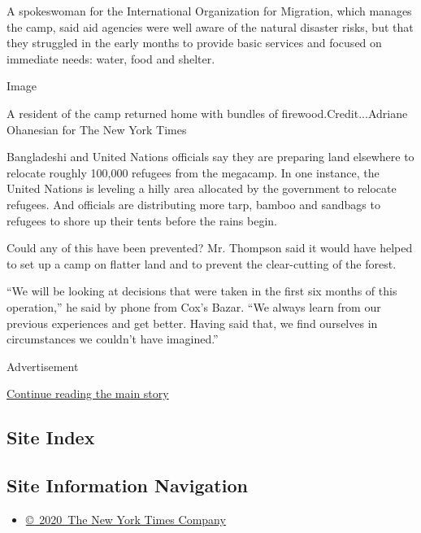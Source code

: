 A spokeswoman for the International Organization for Migration, which
manages the camp, said aid agencies were well aware of the natural
disaster risks, but that they struggled in the early months to provide
basic services and focused on immediate needs: water, food and shelter.

Image

A resident of the camp returned home with bundles of
firewood.Credit...Adriane Ohanesian for The New York Times

Bangladeshi and United Nations officials say they are preparing land
elsewhere to relocate roughly 100,000 refugees from the megacamp. In one
instance, the United Nations is leveling a hilly area allocated by the
government to relocate refugees. And officials are distributing more
tarp, bamboo and sandbags to refugees to shore up their tents before the
rains begin.

Could any of this have been prevented? Mr. Thompson said it would have
helped to set up a camp on flatter land and to prevent the clear-cutting
of the forest.

``We will be looking at decisions that were taken in the first six
months of this operation,'' he said by phone from Cox's Bazar. ``We
always learn from our previous experiences and get better. Having said
that, we find ourselves in circumstances we couldn't have imagined.''

Advertisement

\protect\hyperlink{after-bottom}{Continue reading the main story}

\hypertarget{site-index}{%
\subsection{Site Index}\label{site-index}}

\hypertarget{site-information-navigation}{%
\subsection{Site Information
Navigation}\label{site-information-navigation}}

\begin{itemize}
\tightlist
\item
  \href{https://help.nytimes3xbfgragh.onion/hc/en-us/articles/115014792127-Copyright-notice}{©~2020~The
  New York Times Company}
\end{itemize}

